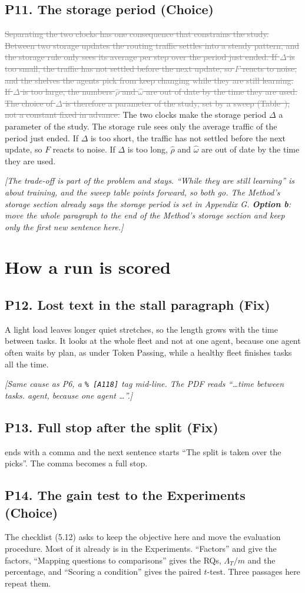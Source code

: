 \documentclass[11pt,a4paper]{article}
\newcommand{\new}[1]{\textcolor{newc}{#1}}
\newcommand{\old}[1]{\textcolor{gray}{\sout{#1}}}
\newcommand{\note}[1]{{\small\itshape [#1]}}
\newcommand{\lab}[1]{\textsf{\footnotesize\detokenize{#1}}}
\renewcommand{\ref}[1]{\lab{#1}}
\newcommand{\pitem}[2]{\subsection*{P#1. #2}}
\begin{document}
\pitem{11}{The storage period (Choice)}
\old{Separating the two clocks has one consequence that constrains the
study. Between two storage updates the routing traffic settles into a steady
pattern, and the storage rule only sees its average per step over the period
just ended. If $\Delta$ is too small, the traffic has not settled before the
next update, so $F$ reacts to noise, and the shelves the agents pick from
keep changing while they are still learning. If $\Delta$ is too large, the
numbers $\hat\rho$ and $\hat\omega$ are out of date by the time they are
used. The choice of $\Delta$ is therefore a parameter of the study, set by
a sweep (Table~\ref{tab:storageparams}), not a constant fixed in advance.}
\new{The two clocks make the storage period $\Delta$ a parameter of the
study. The storage rule sees only the average traffic of the period just
ended. If $\Delta$ is too short, the traffic has not settled before the next
update, so $F$ reacts to noise. If $\Delta$ is too long, $\hat\rho$ and
$\hat\omega$ are out of date by the time they are used.}

\note{The trade-off is part of the problem and stays. ``While they are still
learning'' is about training, and the sweep table points forward, so both
go. The Method's storage section already says the storage period is set in
Appendix G. \textbf{Option b}: move the whole paragraph to the end of the
Method's storage section and keep only the first new sentence here.}

\section*{How a run is scored}

\pitem{12}{Lost text in the stall paragraph (Fix)}
A light load leaves longer quiet stretches, so the length grows with the
time between tasks. \new{It looks at the whole fleet and not at one} agent,
because one agent often waits by plan, as under Token Passing, while a
healthy fleet finishes tasks all the time.

\note{Same cause as P6, a \texttt{\%~[A118]} tag mid-line. The PDF reads
``\dots time between tasks. agent, because one agent \dots''.}

\pitem{13}{Full stop after the split (Fix)}
\lab{eq:split} ends with a comma and the next sentence starts ``The split is
taken over the picks''. The comma becomes a full stop.

\pitem{14}{The gain test to the Experiments (Choice)}
The checklist (5.12) asks to keep the objective here and move the evaluation
procedure. Most of it already is in the Experiments. ``Factors'' and
\lab{tab:expfactors} give the factors, ``Mapping questions to comparisons''
gives the RQs, $\Lambda_T/m$ and the percentage, and ``Scoring a condition''
gives the paired $t$-test. Three passages here repeat them.
\end{document}

